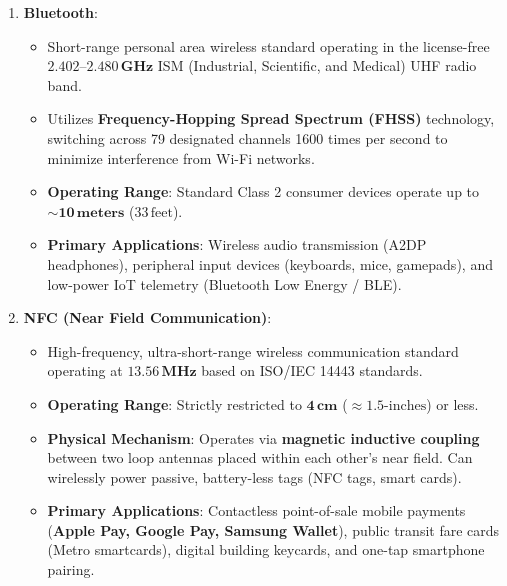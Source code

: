 \begin{enumerate}[leftmargin=1.5em]
    \item \textbf{Bluetooth}:
    \begin{itemize}
        \item Short-range personal area wireless standard operating in the license-free $\mathbf{2.402\text{--}2.480\,\text{GHz}}$ ISM (Industrial, Scientific, and Medical) UHF radio band.
        \item Utilizes \textbf{Frequency-Hopping Spread Spectrum (FHSS)} technology, switching across 79 designated channels 1600 times per second to minimize interference from Wi-Fi networks.
        \item \textbf{Operating Range}: Standard Class 2 consumer devices operate up to $\sim \mathbf{10\,\text{meters}}$ ($33\,\text{feet}$).
        \item \textbf{Primary Applications}: Wireless audio transmission (A2DP headphones), peripheral input devices (keyboards, mice, gamepads), and low-power IoT telemetry (Bluetooth Low Energy / BLE).
    \end{itemize}

    \item \textbf{NFC (Near Field Communication)}:
    \begin{itemize}
        \item High-frequency, ultra-short-range wireless communication standard operating at $\mathbf{13.56\,\text{MHz}}$ based on ISO/IEC 14443 standards.
        \item \textbf{Operating Range}: Strictly restricted to $\mathbf{4\,\text{cm}}$ ($\approx 1.5\text{-inches}$) or less.
        \item \textbf{Physical Mechanism}: Operates via \textbf{magnetic inductive coupling} between two loop antennas placed within each other's near field. Can wirelessly power passive, battery-less tags (NFC tags, smart cards).
        \item \textbf{Primary Applications}: Contactless point-of-sale mobile payments (\textbf{Apple Pay, Google Pay, Samsung Wallet}), public transit fare cards (Metro smartcards), digital building keycards, and one-tap smartphone pairing.
    \end{itemize}
\end{enumerate}

